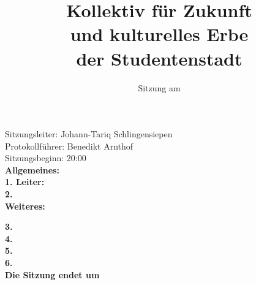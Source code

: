 \documentclass{article}
\begin{document}
\title{Kollektiv für Zukunft\\
    und kulturelles Erbe\\
    der Studentenstadt}

\author{Sitzung am }
\date{}
\Large
\maketitle
\normalsize

\vspace{1em}
Sitzungsleiter: Johann-Tariq Schlingensiepen \\
Protokollführer: Benedikt Arnthof \\
Sitzungsbeginn: 20:00 \\

\textbf{Allgemeines:} \\

\textbf{1. Leiter:}\\

\textbf{2. }\\

\textbf{Weiteres:}

\textbf{3. }\\

\textbf{4. }\\

\textbf{5.}\\

\textbf{6.}\\


\textbf{Die Sitzung endet um }
\end{document}
